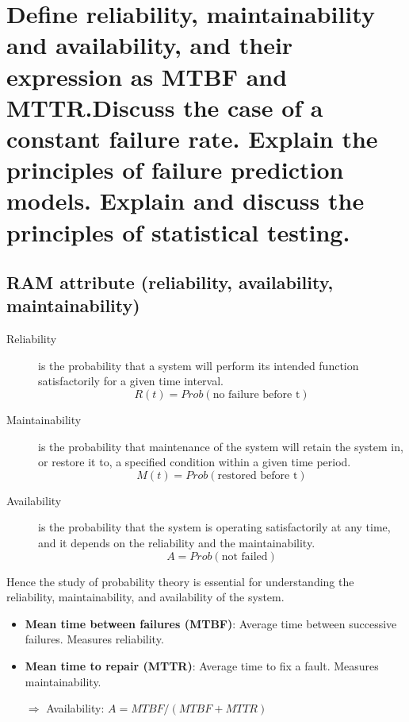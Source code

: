 \clearpage{}
\section{Define reliability, maintainability and availability, and their
expression as MTBF and MTTR.\@ Discuss the case of a constant failure rate.
Explain the principles of failure prediction models. Explain and discuss
the principles of statistical testing.}

\subsection{RAM attribute (reliability, availability, maintainability)}

\begin{description}

    \item[Reliability] is the probability that a system will perform its
        intended function satisfactorily for a given time interval. 
    $$R(t) = Prob(\text{no failure before t})$$

    \item[Maintainability] is the probability that maintenance of the
        system will retain the system in, or restore it to, a specified
        condition within a given time period. 
        $$M(t) = Prob(\text{restored before t})$$

    \item[Availability] is the probability that the system is operating
        satisfactorily at any time, and it depends on the reliability
        and the maintainability.  
        $$A = Prob(\text{not failed})$$
\end{description}

Hence the study of probability theory is essential for understanding the
reliability, maintainability, and availability of the system.

\begin{itemize}

    \item \textbf{Mean time between failures (MTBF)}: Average time
        between successive failures. Measures reliability.

\item \textbf{Mean time to repair (MTTR)}: Average time to fix a fault.
    Measures maintainability. 

\item[$\Rightarrow$] Availability: $A = MTBF / (MTBF + MTTR)$
    \end{itemize}

